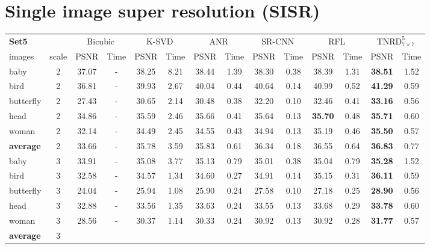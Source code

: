 \documentclass[10pt,journal,compsoc]{IEEEtran}
\begin{document}
\section{Single image super resolution (SISR)}
\begin{table*}[t!]
\centering
\begin{tabular}{|l| c| c| c| c| c| c| c| c| c| c| c|c| c|}
\hline
\textbf{Set5} & & \multicolumn{2}{c|}{Bicubic}& \multicolumn{2}{c|}{K-SVD \cite{SRKSVD}}& \multicolumn{2}{c|}{ANR \cite{ANR}}
& \multicolumn{2}{c|}{SR-CNN \cite{SRCNN}} & \multicolumn{2}{c|}{RFL \cite{schulter15}} 
& \multicolumn{2}{c|}{$\text{TNRD}_{7 \times 7}^5$} \\
\cline{3-14}
images & scale & PSNR & Time& PSNR & Time& PSNR & Time& PSNR & Time& PSNR & Time& PSNR & Time\\
\hline\hline
baby & 2 & 37.07 & - &38.25 & 8.21 & 38.44 & 1.39 & 38.30 & 0.38 & 38.39 & 1.31 & \textbf{38.51} & 1.52\\
bird  & 2 & 36.81 & - &39.93 & 2.67 & 40.04 & 0.44 & 40.64 & 0.14 & 40.99 & 0.52 & \textbf{41.29} & 0.59 \\
butterfly  & 2 & 27.43 & - & 30.65 & 2.14 & 30.48 & 0.38 & 32.20 & 0.10 & 32.46 & 0.41 & \textbf{33.16} & 0.56\\
head  & 2 & 34.86 & - & 35.59 & 2.46 &35.66 & 0.41 & 35.64 & 0.13 & \textbf{35.70} & 0.48 & \textbf{35.71} & 0.60\\
woman  & 2 & 32.14 & - & 34.49 & 2.45 & 34.55 & 0.43 & 34.94 & 0.13 & 35.19 & 0.46 & \textbf{35.50} & 0.57\\
\hline\hline
\rowcolor[gray]{0.85} \textbf{average}  & 2 
& 33.66 & - & 35.78 & 3.59 & 35.83 & 0.61 & 36.34 & 0.18 & 36.55 & 0.64 & \textbf{36.83} & 0.77\\
\hline\hline
baby & 3 & 33.91 & - &35.08 & 3.77 & 35.13 & 0.79 & 35.01 & 0.38 & 35.04 & 0.79 & \textbf{35.28} & 1.52\\
bird  & 3 & 32.58 & - &34.57 & 1.34 & 34.60 & 0.27 & 34.91 & 0.14 & 35.15 & 0.31 & \textbf{36.11} & 0.59 \\
butterfly  & 3 & 24.04 & - & 25.94 & 1.08 & 25.90 & 0.24 & 27.58 & 0.10 & 27.18 & 0.25 & \textbf{28.90} & 0.56\\
head  & 3 & 32.88 & - & 33.56 & 1.35 &33.63 & 0.24 & 33.55 & 0.13 & 33.68 & 0.29 & \textbf{33.78} & 0.60\\
woman  & 3 & 28.56 & - & 30.37 & 1.14 & 30.33 & 0.24 & 30.92 & 0.13 & 30.92 & 0.28 & \textbf{31.77} & 0.57\\
\hline\hline
\rowcolor[gray]{0.85} \textbf{average}  & 3

\end{tabular}
\end{table*}
\end{document}
